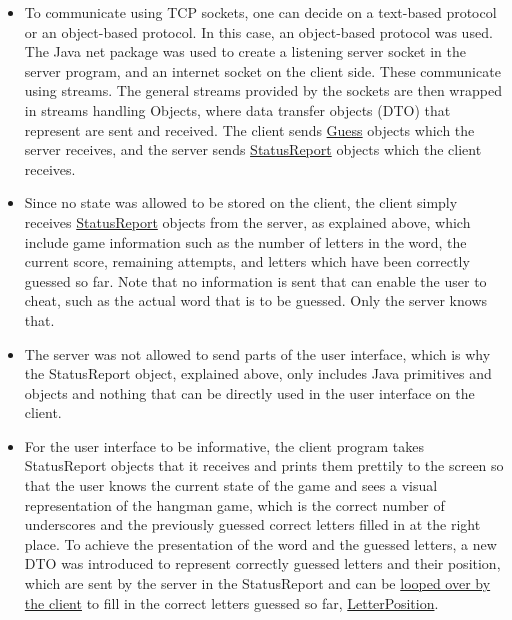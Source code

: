 \documentclass[a4paper]{scrartcl}
\begin{document}
\begin{itemize}
    \item To communicate using TCP sockets, one can decide on a text-based protocol or an object-based protocol. In this case, an object-based protocol was used. The Java net package was used to create a listening server socket in the server program, and an internet socket on the client side. These communicate using streams. The general streams provided by the sockets are then wrapped in streams handling Objects, where data transfer objects (DTO) that represent are sent and received. The client sends \href{https://github.com/fongie/Hangman/blob/master/hangmanclient/src/main/java/DTO/Guess.java}{Guess} objects which the server receives, and the server sends \href{https://github.com/fongie/Hangman/blob/master/hangmanserver/src/main/java/DTO/StatusReport.java}{StatusReport} objects which the client receives.
    
    \item Since no state was allowed to be stored on the client, the client simply receives \href{https://github.com/fongie/Hangman/blob/master/hangmanserver/src/main/java/DTO/StatusReport.java}{StatusReport} objects from the server, as explained above, which include game information such as the number of letters in the word, the current score, remaining attempts, and letters which have been correctly guessed so far. Note that no information is sent that can enable the user to cheat, such as the actual word that is to be guessed. Only the server knows that.
    
    \item The server was not allowed to send parts of the user interface, which is why the StatusReport object, explained above, only includes Java primitives and objects and nothing that can be directly used in the user interface on the client.
    
    \item For the user interface to be informative, the client program takes StatusReport objects that it receives and prints them prettily to the screen so that the user knows the current state of the game and sees a visual representation of the hangman game, which is the correct number of underscores and the previously guessed correct letters filled in at the right place. To achieve the presentation of the word and the guessed letters, a new DTO was introduced to represent correctly guessed letters and their position, which are sent by the server in the StatusReport and can be \href{https://github.com/fongie/Hangman/blob/50fc79c8c3e3d40953705370cbfbb7dee6867700/hangmanclient/src/main/java/view/UserInterface.java#L75}{looped over by the client} to fill in the correct letters guessed so far, \href{https://github.com/fongie/Hangman/blob/master/hangmanserver/src/main/java/DTO/LetterPosition.java}{LetterPosition}.
    

\end{itemize}
\end{document}
